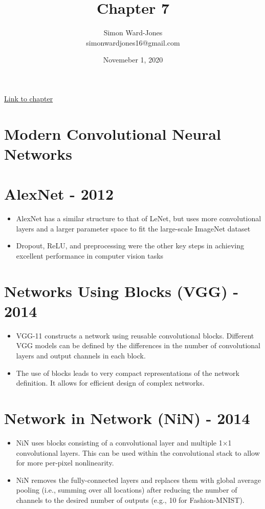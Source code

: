 \documentclass[12pt,notitlepage]{article}
\begin{document}


\title{\Large{\textbf{Chapter 7}}}
\date{Novemeber 1, 2020}
\author{Simon Ward-Jones\\simonwardjones16@gmail.com}

\maketitle
\href{https://d2l.ai/chapter_convolutional-modern/index.html}{Link to chapter}

\section{Modern Convolutional Neural Networks}

\section{AlexNet - 2012}
\begin{itemize}
  \item AlexNet has a similar structure to that of LeNet, but uses more convolutional layers and a larger parameter space to fit the large-scale ImageNet dataset
  \item Dropout, ReLU, and preprocessing were the other key steps in achieving excellent performance in computer vision tasks
\end{itemize}

\section{ Networks Using Blocks (VGG) - 2014 }
\begin{itemize}
  \item VGG-11 constructs a network using reusable convolutional blocks. Different VGG models can be defined by the differences in the number of convolutional layers and output channels in each block.
  \item The use of blocks leads to very compact representations of the network definition. It allows for efficient design of complex networks.
\end{itemize}

\section{ Network in Network (NiN) - 2014 }
\begin{itemize}
  \item NiN uses blocks consisting of a convolutional layer and multiple  1×1  convolutional layers. This can be used within the convolutional stack to allow for more per-pixel nonlinearity.
  \item NiN removes the fully-connected layers and replaces them with global average pooling (i.e., summing over all locations) after reducing the number of channels to the desired number of outputs (e.g., 10 for Fashion-MNIST).
\end{itemize}
\end{document}
